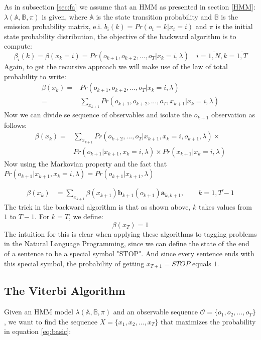 \documentclass[a4paper,12pt]{article}
\theoremstyle{definition}
\begin{document}
As in subsection \ref{sec:fa} we assume that an HMM as presented in section \ref{HMM}: $\lambda(\mathbb{A}, \mathbb{B}, \pi)$ is given, where $\mathbb{A}$ is the state transition probability and $\mathbb{B}$ is the emission probability matrix, e.i. $b_i(k) = Pr(o_t = k|x_t=i)$ and $\pi$ is the initial state probability distribution, the objective of the backward algorithm is to compute:
\begin{equation}\label{eq:ba1}
\beta_i(k)=\beta(x_k=i) = Pr(o_{k+1},o_{k+2},...,o_{T} | x_k=i, \lambda) \quad i=\overline{1,N}, k=\overline{1,T}
\end{equation}
Again, to get the recursive approach we will make use of the law of total probability to write:
\begin{align}
\beta(x_k) =&  Pr(o_{k+1},o_{k+2},...,o_{T} | x_k=i, \lambda) \\
=& \sum_{x_{k+1}} Pr(o_{k+1},o_{k+2},...,o_{T},x_{k+1} | x_k=i, \lambda)
\end{align}
Now we can divide se sequence of observables and isolate the $o_{k+1}$ observation as follows:
\begin{align}
\beta(x_k) =& \sum_{x_{k+1}} Pr(o_{k+2},...,o_{T}|x_{k+1},x_{k}=i,o_{k+1}, \lambda)\times\\
&Pr(o_{k+1}|x_{k+1},x_{k}=i,\lambda) \times Pr(x_{k+1}|x_{k}=i,\lambda) 
\end{align}
Now using the Markovian property and the fact that $Pr(o_{k+1}|x_{k+1},x_{k}=i,\lambda) = Pr(o_{k+1}|x_{k+1},\lambda)$

\begin{align}
\beta(x_k) &= \sum_{x_{k+1}}\beta(x_{k+1})\mathbf{b}_{k+1}(o_{k+1})\mathbf{a}_{k,k+1}, \quad\quad k=\overline{1,T-1}
\end{align}
The trick in the backward algorithm is that as shown above, $k$ takes values from $1$ to $T-1$. For $k=T$, we define:
$$\beta(x_T)=1$$ 
The intuition for this is clear when applying these algorithms to tagging problems in the Natural Language Programming, since we can define the state of the end of a sentence to be a special symbol "STOP". And since every sentence ends with this special symbol, the probability of getting $x_{T+1}=STOP$ equals $1$.


\subsection{The Viterbi Algorithm}
Given an HMM model $\lambda(\mathbb{A,B},\pi)$ and an observable sequence $\mathcal{O} = \{o_1,o_2,...,o_T \}$, we want to find the sequence $X=\{x_1,x_2,...,x_T\}$ that maximizes the probability in equation \ref{eq:basic}:
\end{document}
